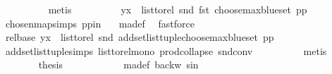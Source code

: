 \begin{isabellebody}
\ \ \ \ \ \ \ \ \isamarkupfalse%
\ {\isacharparenleft}{\kern0pt}metis{\isacharparenright}{\kern0pt}\isanewline
\ \ \ \ \ \ \isamarkupfalse%
\ \isamarkupfalse%
\ {\isachardoublequoteopen}{\isacharparenleft}{\kern0pt}y{\isacharcomma}{\kern0pt}x{\isacharparenright}{\kern0pt}\ {\isasymin}\ list{\isacharunderscore}{\kern0pt}to{\isacharunderscore}{\kern0pt}rel\ {\isacharparenleft}{\kern0pt}snd\ {\isacharparenleft}{\kern0pt}fst\ {\isacharparenleft}{\kern0pt}choose{\isacharunderscore}{\kern0pt}max{\isacharunderscore}{\kern0pt}blue{\isacharunderscore}{\kern0pt}set\ pp{\isacharparenright}{\kern0pt}{\isacharparenright}{\kern0pt}{\isacharparenright}{\kern0pt}{\isachardoublequoteclose}\isanewline
\ \ \ \ \ \ \ \ \isamarkupfalse%
\ chosen{\isacharunderscore}{\kern0pt}map{\isacharunderscore}{\kern0pt}simps{\isacharparenleft}{\kern0pt}{}{\isacharparenright}{\kern0pt}\ pp{\isacharunderscore}{\kern0pt}in\ {}\ \isamarkupfalse%
\ ma{\isacharunderscore}{\kern0pt}def\ \isamarkupfalse%
\ fastforce\isanewline
\ \ \ \ \ \ \isamarkupfalse%
\ \isamarkupfalse%
\ rel{\isacharunderscore}{\kern0pt}base{\isacharcolon}{\kern0pt}\ {\isachardoublequoteopen}{\isacharparenleft}{\kern0pt}y{\isacharcomma}{\kern0pt}x{\isacharparenright}{\kern0pt}\ {\isasymin}\ list{\isacharunderscore}{\kern0pt}to{\isacharunderscore}{\kern0pt}rel\ {\isacharparenleft}{\kern0pt}snd\ {\isacharparenleft}{\kern0pt}add{\isacharunderscore}{\kern0pt}set{\isacharunderscore}{\kern0pt}list{\isacharunderscore}{\kern0pt}tuple{\isacharparenleft}{\kern0pt}choose{\isacharunderscore}{\kern0pt}max{\isacharunderscore}{\kern0pt}blue{\isacharunderscore}{\kern0pt}set\ pp{\isacharparenright}{\kern0pt}{\isacharparenright}{\kern0pt}{\isacharparenright}{\kern0pt}{\isachardoublequoteclose}\isanewline
\ \ \ \ \ \ \ \ \isamarkupfalse%
\ add{\isacharunderscore}{\kern0pt}set{\isacharunderscore}{\kern0pt}list{\isacharunderscore}{\kern0pt}tuple{\isachardot}{\kern0pt}simps\ list{\isacharunderscore}{\kern0pt}to{\isacharunderscore}{\kern0pt}rel{\isacharunderscore}{\kern0pt}mono\ prod{\isachardot}{\kern0pt}collapse\ snd{\isacharunderscore}{\kern0pt}conv\isanewline
\ \ \ \ \ \ \ \ \isamarkupfalse%
\ metis\ \isanewline
\isanewline
\ \ \ \ \ \ \isamarkupfalse%
\ {\isacharquery}{\kern0pt}thesis\ \isanewline
\ \ \ \ \ \ \ \ \isamarkupfalse%
\ \ ma{\isacharunderscore}{\kern0pt}def\ backw\ s{\isacharunderscore}{\kern0pt}in\isanewline

\end{isabellebody}
